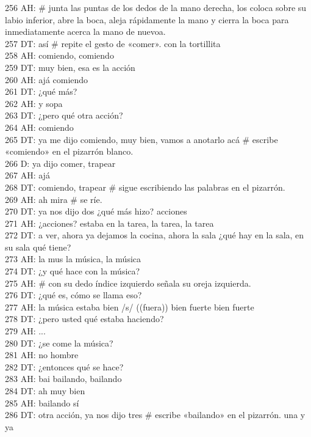 256 AH: \# junta las puntas de los dedos de la mano derecha, los coloca sobre su labio inferior, abre la boca, aleja rápidamente la mano y cierra la boca para inmediatamente acerca la mano de nuevoa.\\
257 DT: así \# repite el gesto de «comer». con la tortillita\\
258 AH: comiendo, comiendo\\
259 DT: muy bien, esa es la acción\\
260 AH: ajá comiendo\\
261 DT: ¿qué más?\\
262 AH: y sopa\\
263 DT: ¿pero qué otra acción?\\
264 AH: comiendo\\
265 DT: ya me dijo comiendo, muy bien, vamos a anotarlo acá \# escribe «comiendo» en el pizarrón blanco.\\
266 D: ya dijo comer, trapear\\
267 AH: ajá\\
268 DT: comiendo, trapear \# sigue escribiendo las palabras en el pizarrón.\\
269 AH: ah mira \# se ríe.\\
270 DT: ya nos dijo dos ¿qué más hizo? acciones\\
271 AH: ¿acciones? estaba en la tarea, la tarea, la tarea\\
272 DT: a ver, ahora ya dejamos la cocina, ahora la sala ¿qué hay en la sala, en su sala qué tiene?\\
273 AH: la mus la música, la música\\
274 DT: ¿y qué hace con la música?\\
275 AH: \# con su dedo índice izquierdo señala su oreja izquierda.\\
276 DT: ¿qué es, cómo se llama eso?\\
277 AH: la música estaba bien /s/ ((fuera)) bien fuerte bien fuerte\\
278 DT: ¿pero usted qué estaba haciendo?\\
279 AH: ...\\
280 DT: ¿se come la música?\\
281 AH: no hombre\\
282 DT: ¿entonces qué se hace?\\
283 AH: bai bailando, bailando\\
284 DT: ah muy bien\\
285 AH: bailando sí\\
286 DT: otra acción, ya nos dijo tres \# escribe «bailando» en el pizarrón. una y ya\\
